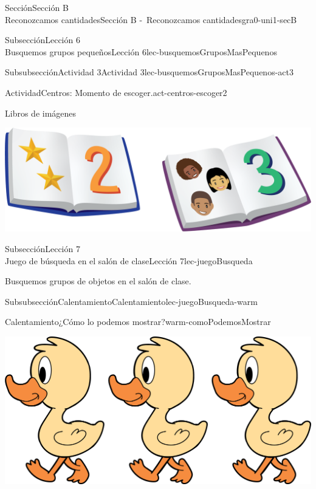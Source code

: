 \begin{sectionptx}{Sección}{{\Large Sección B\\}Reconozcamos cantidades}{}{Sección B -~Reconozcamos cantidades}{}{}{gra0-uni1-secB}
\begin{subsectionptx}{Subsección}{{\normalsize Lección 6\\[-0.05cm]}Busquemos grupos pequeños}{}{Lección 6}{}{}{lec-busquemosGruposMasPequenos}
\begin{subsubsectionptx}{Subsubsección}{Actividad 3}{}{Actividad 3}{}{}{lec-busquemosGruposMasPequenos-act3}
\begin{activity}{Actividad}{Centros: Momento de escoger.}{act-centros-escoger2}
\begin{sidebyside}{2}{0.025}{0.025}{0.05}
\begin{sbspanel}{0.45}%
Libros de imágenes%
\par
\includegraphics[max width=\linewidth, center]{external/png-source/K.1.D Beta Student Workbooks.Books.png}
\end{sbspanel}%
\end{sidebyside}%
\end{activity}%
\end{subsubsectionptx}
\end{subsectionptx}
%
%
\typeout{************************************************}
\typeout{************************************************}
%
\begin{subsectionptx}{Subsección}{{\normalsize Lección 7\\[-0.05cm]}Juego de búsqueda en el salón de clase}{}{Lección 7}{}{}{lec-juegoBusqueda}
\begin{introduction}{}%
Busquemos grupos de objetos en el salón de clase.%
\end{introduction}%
%
%
\typeout{************************************************}
\typeout{************************************************}
%
\begin{subsubsectionptx}{Subsubsección}{Calentamiento}{}{Calentamiento}{}{}{lec-juegoBusqueda-warm}
\begin{exploration}{Calentamiento}{¿Cómo lo podemos mostrar?}{warm-comoPodemosMostrar}%
\begin{image}{0.0}{1}{0.0}{}%
\includegraphics[max width=\linewidth, center]{external/png-source/3 ducks.png}

\end{image}
\end{exploration}
\end{subsubsectionptx}
\end{subsectionptx}
\end{sectionptx}
